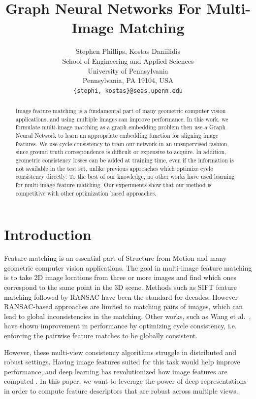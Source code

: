 \documentclass{article} %
\title{Graph Neural Networks For Multi-Image Matching}
\author{Stephen Phillips, Kostas Daniilidis \\
School of Engineering and Applied Sciences \\
University of Pennsylvania \\
Pennsylvania, PA 19104, USA \\
\texttt{\{stephi, kostas\}@seas.upenn.edu} \\
}
\begin{document}
\maketitle

\begin{abstract}
    Image feature matching is a fundamental part of many geometric computer vision applications, and using multiple images can improve performance.
    In this work, we formulate multi-image matching as a graph embedding problem then use a Graph Neural Network to learn an appropriate embedding function for aligning image features.
    We use cycle consistency to train our network in an unsupervised fashion, since ground truth correspondence is difficult or expensive to acquire.
    In addition, geometric consistency losses can be added at training time, even if the information is not available in the test set, unlike previous approaches which optimize cycle consistency directly.
    To the best of our knowledge, no other works have used learning for multi-image feature matching.
    Our experiments show that our method is competitive with other optimization based approaches.
\end{abstract}

\section{Introduction}

Feature matching is an essential part of Structure from Motion and many geometric computer vision applications.
The goal in multi-image feature matching is to take 2D image locations from three or more images and find which ones correspond to the same point in the 3D scene.
Methods such as SIFT feature matching \cite{lowe2004distinctive} followed by RANSAC \cite{fischler1981random} have been the standard for decades.
However RANSAC-based approaches are limited to matching pairs of images, which can lead to global inconsistencies in the matching.
Other works, such as Wang et al.~\cite{wang2017multi}, have shown improvement in performance by optimizing cycle consistency, i.e. enforcing the pairwise feature matches to be globally consistent.

However, these multi-view consistency algorithms struggle in distributed and robust settings.
Having image features suited for this task would help improve performance, and deep learning has revolutionized how image features are computed \cite{yi2016lift}.
In this paper, we want to leverage the power of deep representations in order to compute feature descriptors that are robust across multiple views.
\end{document}
